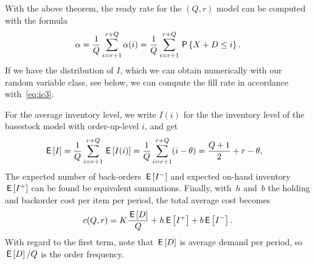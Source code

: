 \documentclass[stochastic-or.tex]{subfiles}
\begin{document}
With the above theorem, the ready rate for the $(Q,r)$ model can be computed with the formula
\begin{align}
   \alpha = \frac1Q \sum_{i=r+1}^{r+Q} \alpha(i) = \frac{1}{Q} \sum_{i=r+1}^{r+Q} \P{X+D\leq i}. %
\end{align}
If we have the distribution of $I$, which we can obtain numerically with our random variable class, see below, we can compute the fill rate in accordance with~\cref{eq:ic3}.



For the average inventory level, we write $I(i)$ for the the inventory level of the basestock model with order-up-level $i$, and get
\begin{align*}
   \,\mathsf{E}\left[I\right]
   &= \frac1Q\sum_{i=r+1}^{r+Q} \,\mathsf{E}\left[I(i)\right]
     = \frac1Q\sum_{i=r+1}^{r+Q} (i - \theta)
   = \frac{Q+1}2 + r - \theta,
\end{align*}
The  expected number of back-orders $\,\mathsf{E}\left[I^-\right]$ and expected on-hand inventory $\,\mathsf{E}\left[I^+\right]$ can be found be equivalent summations.
Finally, with~$h$ and~$b$ the holding and backorder cost per item per period,  the total average cost becomes
\begin{equation*}
c(Q,r) = K\frac{\,\mathsf{E}\left[D\right]}{Q} + h \,\mathsf{E}\left[I^{+}\right] +  b \,\mathsf{E}\left[I^-\right].
\end{equation*}
With regard to the first term, note that $\,\mathsf{E}\left[D\right]$ is average demand per period, so $\,\mathsf{E}\left[D\right] / Q$ is the order frequency.
\end{document}
